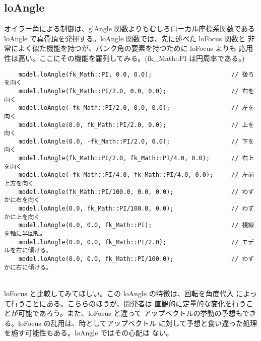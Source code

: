 \subsection{loAngle}
オイラー角による制御は、glAngle 関数よりもむしろローカル座標系関数である
loAngle で真骨頂を発揮する。loAngle 関数では、先に述べた loFocus 関数と
非常によく似た機能を持つが、バンク角の要素を持つために loFocus よりも
応用性は高い。ここにその機能を羅列してみる。(fk\_Math::PI は円周率である。)
\\
\begin{breakbox}
\begin{verbatim}
    model.loAngle(fk_Math::PI, 0.0, 0.0);                      // 後ろを向く
    model.loAngle(fk_Math::PI/2.0, 0.0, 0.0);                  // 右を向く
    model.loAngle(-fk_Math::PI/2.0, 0.0, 0.0);                 // 左を向く
    model.loAngle(0.0, fk_Math::PI/2.0, 0.0);                  // 上を向く
    model.loAngle(0.0, -fk_Math::PI/2.0, 0.0);                 // 下を向く
    model.loAngle(fk_Math::PI/2.0, fk_Math::PI/4.0, 0.0);      // 右上を向く
    model.loAngle(-fk_Math::PI/4.0, fk_Math::PI/4.0, 0.0);     // 左前上方を向く
    model.loAngle(fk_Math::PI/100.0, 0.0, 0.0);                // わずかに右を向く
    model.loAngle(0.0, fk_Math::PI/100.0, 0.0);                // わずかに上を向く
    model.loAngle(0.0, 0.0, fk_Math::PI);                      // 視線を軸に半回転。
    model.loAngle(0.0, 0.0, fk_Math::PI/2.0);                  // モデルを右に傾ける。
    model.loAngle(0.0, 0.0, fk_Math::PI/100.0);                // わずかに右に傾ける。
\end{verbatim}
\end{breakbox}
~ \\
loFocus と比較してみてほしい。この loAngle の特徴は、回転を角度代入
によって行うことにある。こちらのほうが、開発者は
直観的に定量的な変化を行うことが可能であろう。また、loFocus と違って
アップベクトルの挙動の予想もできる。loFocus の乱用は、時としてアップベクトル
に対して予想と食い違った処理を施す可能性もある。loAngle ではその心配は
ない。

